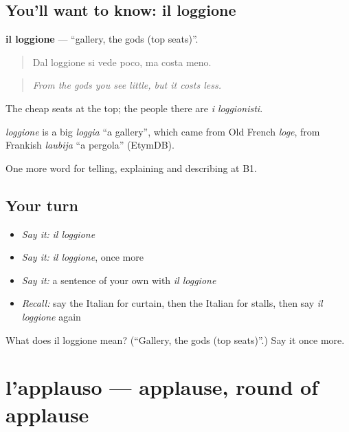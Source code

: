 \subsection*{You'll want to know: il loggione}
\textbf{il loggione} — \textquotedblleft{}gallery, the gods (top seats)\textquotedblright{}.

\begin{quote}
Dal loggione si vede poco, ma costa meno.
\end{quote}

\begin{quote}
\emph{From the gods you see little, but it costs less.}
\end{quote}

The cheap seats at the top; the people there are \emph{i loggionisti}.

\begin{cousinweb}
\emph{loggione} is a big \emph{loggia} \textquotedblleft{}a gallery\textquotedblright{}, which came from Old French \emph{loge}, from Frankish \emph{laubija} \textquotedblleft{}a pergola\textquotedblright{} (EtymDB).
\end{cousinweb}

\begin{grammarlens}[title={What you've built}]
One more word for telling, explaining and describing at B1.
\end{grammarlens}

\subsection*{Your turn}
\begin{itemize}
\raggedright
  \item \emph{Say it:} \emph{il loggione}
  \item \emph{Say it:} \emph{il loggione}, once more
  \item \emph{Say it:} a sentence of your own with \emph{il loggione}
  \item \emph{Recall:} say the Italian for curtain, then the Italian for stalls, then say \emph{il loggione} again
\end{itemize}

\begin{tcolorbox}[breakable,colback=teal!4,colframe=teal!35!black,title={Before you move on}]
What does il loggione mean? (\textquotedblleft{}Gallery, the gods (top seats)\textquotedblright{}.) Say it once more.
\end{tcolorbox}
\section[l'applauso]{l'applauso — applause, round of applause}

